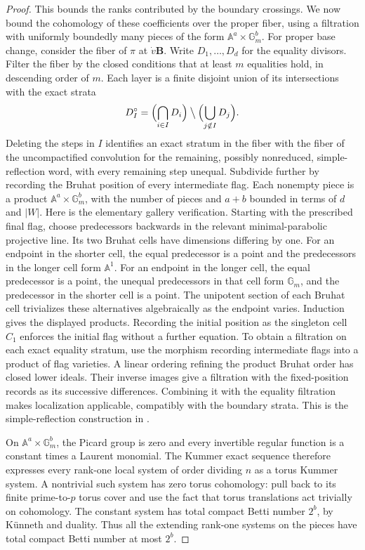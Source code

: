 \begin{proof}
This bounds the ranks contributed by the boundary crossings.
We now bound the cohomology of these coefficients over the proper
fiber, using a filtration with uniformly boundedly many pieces of
the form \(\mathbb A^a\times\mathbb G_m^b\).
For proper base change, consider the fiber of \(\pi\) at
\(\dot v\mathbf B\). Write \(D_1,\ldots,D_d\) for the equality
divisors. Filter the fiber by the closed conditions that at least
\(m\) equalities hold, in descending order of \(m\). Each layer is a
finite disjoint union of its intersections with the exact strata
\[
 D_I^\circ=
 \Bigl(\bigcap_{i\in I}D_i\Bigr)
       \mathbin{\big\backslash}\Bigl(\bigcup_{j\notin I}D_j\Bigr).
\]
Deleting the steps in \(I\) identifies an exact stratum in the fiber
with the fiber of the uncompactified convolution for the remaining,
possibly nonreduced, simple-reflection word, with every remaining
step unequal. Subdivide further by recording the Bruhat position of
every intermediate flag.
Each nonempty piece is a product
\(\mathbb A^a\times\mathbb G_m^b\), with the number of pieces and
\(a+b\) bounded in terms of \(d\) and \(|W|\). Here is the elementary
gallery verification. Starting with the prescribed final flag, choose
predecessors backwards in the relevant minimal-parabolic projective
line. Its two Bruhat cells have dimensions differing by one. For an
endpoint in the shorter cell, the equal predecessor is a point and
the predecessors in the longer cell form \(\mathbb A^1\). For an
endpoint in the longer cell, the equal predecessor is a point, the
unequal predecessors in that cell form \(\mathbb G_m\), and the
predecessor in the shorter cell is a point. The unipotent section of
each Bruhat cell trivializes these alternatives algebraically as the
endpoint varies. Induction gives the displayed products. Recording
the initial position as the singleton cell \(C_1\) enforces the
initial flag without a further equation. To obtain a filtration on
each exact equality stratum, use the morphism recording intermediate
flags into a product of flag varieties. A linear ordering refining
the product Bruhat order has closed lower ideals. Their inverse
images give a filtration with the fixed-position records as its
successive differences. Combining it with the equality filtration
makes localization applicable, compatibly with the boundary strata.
This is the simple-reflection construction in
\cite[Theorem 1.1, Proposition 5.3, Lemma 6.2,
and Sections 6.2--6.3]{HainesPaving}.

On \(\mathbb A^a\times\mathbb G_m^b\), the Picard group is zero and
every invertible regular function is a constant times a Laurent
monomial. The Kummer exact sequence therefore expresses every
rank-one local system of order dividing \(n\) as a torus Kummer system.
A nontrivial such system has zero torus cohomology: pull back to its
finite prime-to-\(p\) torus cover and use the fact that torus
translations act trivially on cohomology. The constant system has
total compact Betti number \(2^b\), by K\"unneth and duality.
Thus all the extending rank-one systems on the pieces have total
compact Betti number at most \(2^b\).


\end{proof}
